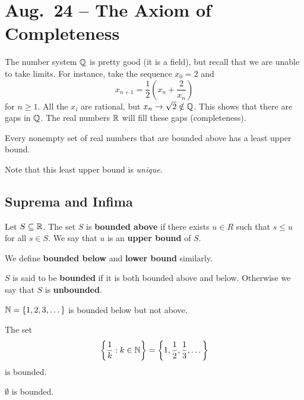 \chapter{Aug.~24 -- The Axiom of Completeness}

The number system $\mathbb{Q}$ is pretty good (it is a field),
but recall that we are unable to take limits. For
instance, take the sequence $x_0 = 2$ and
\[x_{n+1} = \frac{1}{2}\left(x_n + \frac{2}{x_n}\right)\]
for $n \ge 1$. All the $x_i$ are rational, but
$x_n \to \sqrt{2} \notin \mathbb{Q}$. This shows that there are
gaps in $\mathbb{Q}$. The real numbers $\mathbb{R}$ will fill
these gaps (completeness).

\begin{axiom}
Every nonempty set of real numbers that are bounded
above has a least upper bound.
\end{axiom}

Note that this least upper bound is \textit{unique}.

\section{Suprema and Infima}

\begin{definition}
  Let $S \subseteq \mathbb{R}$. The set $S$ is
  \textbf{bounded above} if there exists $u \in R$
  such that  $s \le u$ for all $s \in S$.
  We say that $u$ is an \textbf{upper bound} of $S$.
\end{definition}

We define \textbf{bounded below} and \textbf{lower bound}
similarly.

\begin{definition}
  $S$ is said to be \textbf{bounded} if it is
  both bounded above and below. Otherwise we say that
  $S$ is \textbf{unbounded}.
\end{definition}

\begin{example}
  $\mathbb{N} = \{1, 2, 3, \dots\}$ is bounded below but not
  above.
\end{example}

\begin{example}
  The set
  \[\left\{\frac{1}{k} : k \in \mathbb{N}\right\} = \left\{1, \frac{1}{2}, \frac{1}{3}, \dots\right\}\]
  is bounded.
\end{example}

\begin{example}
  $\emptyset$ is bounded.
\end{example}

